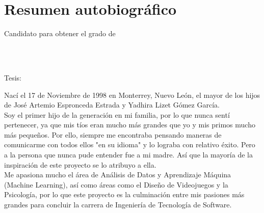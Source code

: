 
\chapter*{Resumen autobiográfico}
\thispagestyle{empty}

\begin{center}
\autor

Candidato para obtener el grado de\\
\grado\\
\orientacion\bigskip

\uanl\\
\fime\bigskip

Tesis:\\
\textsc{\large\titulo}
\end{center}\bigskip

Nací el 17 de Noviembre de 1998 en Monterrey, Nuevo León, el mayor de los hijos de José Artemio Espronceda Estrada y Yadhira Lizet Gómez García. \\
Soy el primer hijo de la generación en mi familia, por lo que nunca sentí pertenecer, ya que mis tíos eran mucho más grandes que yo y mis primos mucho más pequeños. Por ello, siempre me encontraba pensando maneras de comunicarme con todos ellos "en su idioma" y lo lograba con relativo éxito. Pero a la persona que nunca pude entender fue a mi madre. Así que la mayoría de la inspiración de este proyecto se lo atribuyo a ella.\\
Me apasiona mucho el área de Análisis de Datos y Aprendizaje Máquina (Machine Learning), así como áreas como el Diseño de Videojuegos y la Psicología, por lo que este proyecto es la culminación entre mis pasiones más grandes para concluir la carrera de Ingeniería de Tecnología de Software.